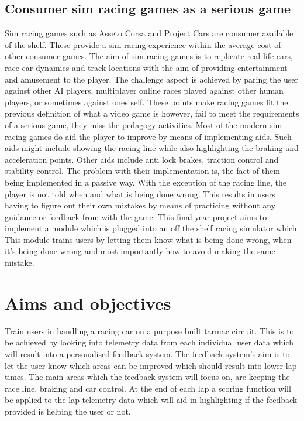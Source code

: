 \documentclass{article}
\begin{document}
\subsection{Consumer sim racing games as a serious game}

Sim racing games such as Asseto Corsa and Project Cars are consumer available of the shelf. These provide a sim racing experience within the average cost of other consumer games. The aim of sim racing games is to replicate real life cars, race car dynamics and track locations with the aim of providing entertainment and amusement to the player. The challenge aspect is achieved by paring the user against other AI players, multiplayer online races played against other human players, or sometimes against ones self. These points make racing games fit the previous definition of what a video game is however, fail to meet the requirements of a serious game, they miss the pedagogy activities. Most of the modern sim racing games do aid the player to improve by means of implementing aids. Such aids might include showing the racing line while also highlighting the braking and acceleration points. Other aids include anti lock brakes, traction control and stability control. The problem with their implementation is, the fact of them being implemented in a passive way. With the exception of the racing line, the player is not told when and what is being done wrong. This results in users having to figure out their own mistakes by means of practicing without any guidance or feedback from with the game. This final year project aims to implement a module which is plugged into an off the shelf racing simulator which. This module trains users by letting them know what is being done wrong, when it's being done wrong and most importantly how to avoid making the same mistake.

\section{Aims and objectives}

Train users in handling a racing car on a purpose built tarmac circuit. This is to be achieved by looking into telemetry data from each individual user data which will result into a personalised feedback system. The feedback system’s aim is to let the user know which areas can be improved which should result into lower lap times. The main areas which the feedback system will focus on, are keeping the race line, braking and car control. At the end of each lap a scoring function will be applied to the lap telemetry data which will aid in highlighting if the feedback provided is helping the user or not.
\end{document}
